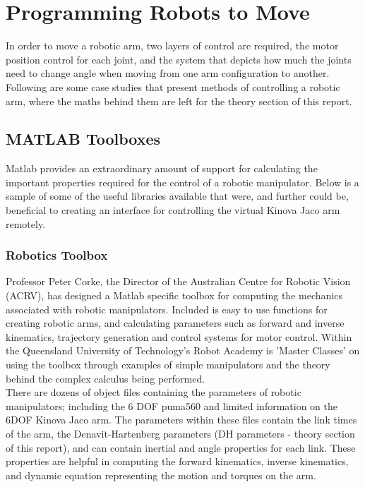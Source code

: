 \documentclass[12pt,openany,a4paper]{book}
\begin{document}
\chapter{Programming Robots to Move}
In order to move a robotic arm, two layers of control are required, the motor position control for each joint, and the system that depicts how much the joints need to change angle when moving from one arm configuration to another. Following are some case studies that present methods of controlling a robotic arm, where the maths behind them are left for the theory section of this report.

\section{MATLAB Toolboxes}
Matlab provides an extraordinary amount of support for calculating the important properties required for the control of a robotic manipulator. Below is a sample of some of the useful libraries available that were, and further could be, beneficial to creating an interface for controlling the virtual Kinova Jaco arm remotely.

\subsection{Robotics Toolbox}
Professor Peter Corke, the Director of the Australian Centre for Robotic Vision (ACRV), has designed a Matlab specific toolbox for computing the mechanics associated with robotic manipulators. Included is easy to use functions for creating robotic arms, and calculating parameters such as forward and inverse kinematics, trajectory generation and control systems for motor control. Within the Queensland University of Technology's Robot Academy is 'Master Classes' on using the toolbox through examples of simple manipulators and the theory behind the complex calculus being performed.\\

There are dozens of object files containing the parameters of robotic manipulators; including the 6 DOF puma560 and limited information on the 6DOF Kinova Jaco arm. The parameters within these files contain the link times of the arm, the Denavit-Hartenberg parameters (DH parameters - theory section of this report), and can contain inertial and angle properties for each link. These properties are helpful in computing the forward kinematics, inverse kinematics, and dynamic equation representing the motion and torques on the arm.
\end{document}
